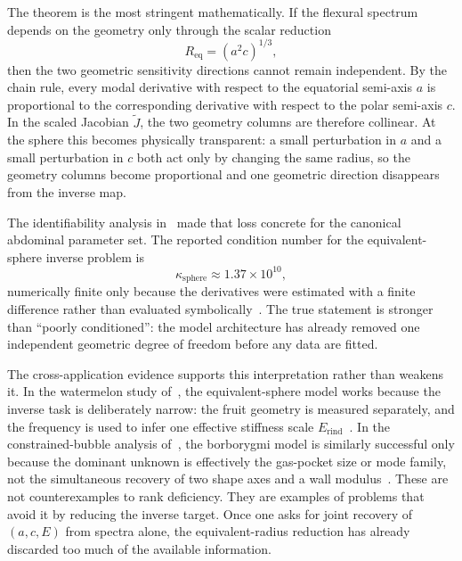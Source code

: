 The theorem is the most stringent mathematically.  If the flexural spectrum depends on the geometry only through
the scalar reduction
\begin{equation}
  R_\mathrm{eq} = (a^2 c)^{1/3},
\end{equation}
then the two geometric sensitivity directions cannot remain independent.  By
the chain rule, every modal derivative with respect to the equatorial semi-axis
$a$ is proportional to the corresponding derivative with respect to the polar
semi-axis $c$.  In the scaled Jacobian $\widetilde{J}$, the two geometry columns are
therefore collinear.  At the sphere this becomes physically transparent: a
small perturbation in $a$ and a small perturbation in $c$ both act only by
changing the same radius, so the geometry columns become proportional and one
geometric direction disappears from the inverse map.

The identifiability analysis in~\cite{BrowntoneP8} made that loss concrete for the canonical abdominal parameter set.  The
reported condition number for the equivalent-sphere inverse problem is
\begin{equation}
  \kappa_\mathrm{sphere} \approx 1.37 \times 10^{10},
\end{equation}
numerically finite only because the derivatives were estimated with a finite
difference rather than evaluated symbolically~\cite{BrowntoneP8}.  The true
statement is stronger than ``poorly conditioned'': the model architecture has
already removed one independent geometric degree of freedom before any data are
fitted.

The cross-application evidence supports this interpretation rather than weakens
it.  In the watermelon study of~\cite{BrowntoneP7}, the equivalent-sphere model works because the inverse
task is deliberately narrow: the fruit geometry is measured separately, and the
frequency is used to infer one effective stiffness scale
$E_\mathrm{rind}$~\cite{BrowntoneP7}.  In the constrained-bubble analysis
of~\cite{BrowntoneP5}, the
borborygmi model is similarly successful only because the dominant unknown is
effectively the gas-pocket size or mode family, not the simultaneous recovery
of two shape axes and a wall modulus~\cite{BrowntoneP5}.  These are not
counterexamples to rank deficiency.  They are examples of problems that avoid
it by reducing the inverse target.  Once one asks for joint recovery of
$(a,c,E)$ from spectra alone, the equivalent-radius reduction has already
discarded too much of the available information.

